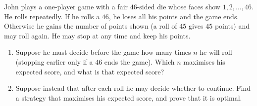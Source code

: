 John plays a one-player game with a fair $46$-sided die whose faces show $1,2,\dots,46$. He rolls repeatedly. If he rolls a $46$, he loses all his points and the game ends. Otherwise he gains the number of points shown (a roll of $45$ gives $45$ points) and may roll again. He may stop at any time and keep his points.
\begin{enumerate}
\item[(a)] Suppose he must decide before the game how many times $n$ he will roll (stopping earlier only if a $46$ ends the game). Which $n$ maximises his expected score, and what is that expected score?
\item[(b)] Suppose instead that after each roll he may decide whether to continue. Find a strategy that maximises his expected score, and prove that it is optimal.
\end{enumerate}

